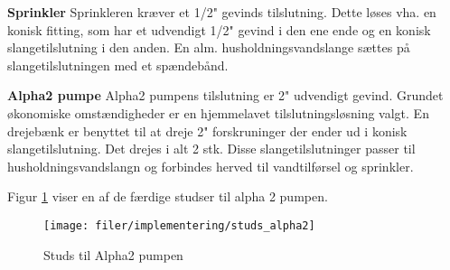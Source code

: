 
\textbf{Sprinkler} \newline
Sprinkleren kræver et 1/2" gevinds tilslutning. Dette løses vha. en konisk fitting, som har et udvendigt 1/2" gevind i den ene ende og en konisk slangetilslutning i den anden. En alm. husholdningsvandslange sættes på slangetilslutningen med et spændebånd. 

\textbf{Alpha2 pumpe}  \newline
Alpha2 pumpens tilslutning er 2" udvendigt gevind. Grundet økonomiske omstændigheder er en hjemmelavet tilslutningsløsning valgt. En drejebænk er benyttet til at dreje 2" forskruninger der ender ud i konisk slangetilslutning. Det drejes i alt 2 stk. Disse slangetilslutninger passer til husholdningsvandslangn og forbindes herved til vandtilførsel og sprinkler.

Figur \ref{lab:fitting_alpha2} viser en af de færdige studser til alpha 2 pumpen. 

\begin{figure}[htb]
\centering
{\texttt{[image: filer/implementering/studs\_alpha2]}}
\caption{Studs til Alpha2 pumpen}
\label{lab:fitting_alpha2}
\end{figure}

